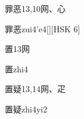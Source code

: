 \begin{Entry}{罪恶}{13,10}{⽹、⼼}
  \begin{Phonetics}{罪恶}{zui4'e4}[][HSK 6]
  \end{Phonetics}
\end{Entry}

\begin{Entry}{置}{13}{⽹}
  \begin{Phonetics}{置}{zhi4}
  \end{Phonetics}
\end{Entry}

\begin{Entry}{置疑}{13,14}{⽹、⽦}
  \begin{Phonetics}{置疑}{zhi4yi2}
  \end{Phonetics}
\end{Entry}


